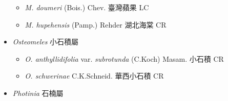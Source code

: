 \begin{itemize}
  \begin{itemize}
        \item[] \textit{M. doumeri} (Bois.) Chev.  臺灣蘋果   LC
        \item[] \textit{M. hupehensis} (Pamp.) Rehder  湖北海棠   CR
  \end{itemize}
 \item[] \textit{Osteomeles} 小石積屬
                                
  \begin{itemize}
        \item[] \textit{O. anthyllidifolia} var. \textit{subrotunda} (C.Koch) Masam.  小石積   CR
        \item[] \textit{O. schwerinae} C.K.Schneid.  華西小石積   CR
  \end{itemize}
 \item[] \textit{Photinia} 石楠屬
                                

\end{itemize}
